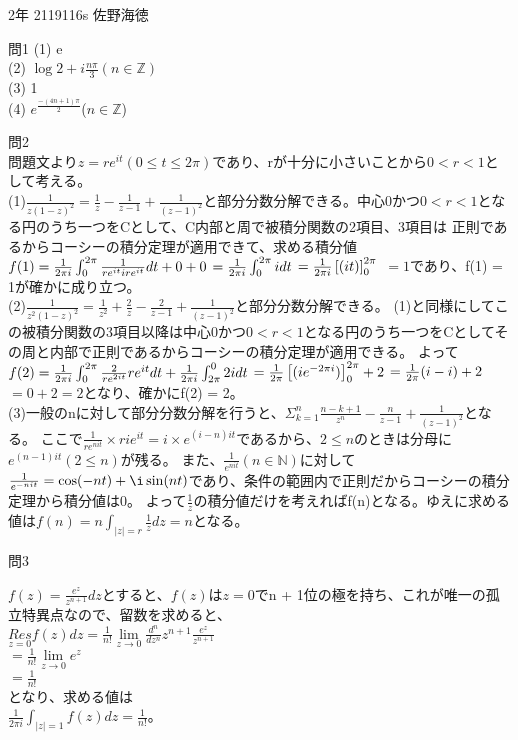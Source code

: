 \documentclass[11pt]{jsarticle}
\begin{document}
    2年 2119116s 佐野海徳\\
    \par 問1
    (1) e\\
    (2) $\log 2 + i \frac{n \pi}{3} (n \in \mathbb{Z})$\\
    (3) 1\\
    (4) $e^{\frac{- (4n + 1)\pi}{2}}$($n \in \mathbb{Z}$)
    \par 問2\\
    問題文より$z = re^{it}(0 \leq t \leq 2\pi)$であり、rが十分に小さいことから$0 < r < 1$として考える。\\
    (1)$\frac{1}{z(1 - z)^2} = \frac{1}{z} - \frac{1}{z - 1} + \frac{1}{(z - 1)^2}$と部分分数分解できる。中心0かつ$0 < r < 1$となる円のうち一つをCとして、C内部と周で被積分関数の2項目、3項目は
    正則であるからコーシーの積分定理が適用できて、求める積分値$f(1) = \frac{1}{2\pi i} \int_{0}^{2\pi} \frac{1}{re^{it} ire^{it}}dt + 0 + 0\\$
    $ = \frac{1}{2\pi i} \int_{0}^{2\pi} i dt \\$
    $ = \frac{1}{2\pi i}\left[ (it) \right]_{0}^{2\pi}\\$
    $ = 1$であり、f(1) = 1が確かに成り立つ。\\
    (2)$\frac{1}{z^2(1 - z)^2} = \frac{1}{z^2} + \frac{2}{z} - \frac{2}{z - 1} + \frac{1}{(z - 1)^2}$と部分分数分解できる。
    (1)と同様にしてこの被積分関数の3項目以降は中心0かつ$0 < r < 1$となる円のうち一つをCとしてその周と内部で正則であるからコーシーの積分定理が適用できる。
    よって$f(2) = \frac{1}{2\pi i} \int_{0}^{2\pi} \frac{2}{re^{2it}}re^{it}dt + \frac{1}{2\pi i} \int_{2\pi}^{0} 2i dt \\$
    $ = \frac{1}{2\pi}\left[ (ie^{-2\pi i}) \right]_{0}^{2\pi} + 2\\$
    $ = \frac{1}{2\pi}(i - i) + 2\\$
    $ = 0 + 2 = 2$となり、確かにf(2) = 2。\\
    (3)一般のnに対して部分分数分解を行うと、$\Sigma_{k = 1}^{n} \frac{n - k + 1}{z^n} - \frac{n}{z - 1} + \frac{1}{(z - 1)^2}$となる。
    ここで$\frac{1}{re^{nit}} \times rie^{it} = i\times e^{(i - n)it}$であるから、$2 \leq n$のときは分母に${e^{(n - 1)it}}(2 \leq n)$が残る。
    また、$\frac{1}{e^{nit}}(n \in \mathbb{N})$に対して$\frac{1}{e^{-nit}} = \cos(-nt) + \i\sin(nt)$であり、条件の範囲内で正則だからコーシーの積分定理から積分値は0。
    よって$\frac{1}{z}$の積分値だけを考えればf(n)となる。ゆえに求める値は$f(n) = n \int_{|z| = r} \frac{1}{z} dz = n$となる。
    \newpage
\par 問3
    \par $f(z) = \frac{e^z}{z^{n + 1}}dz$とすると、$f(z)$は$z = 0$でn + 1位の極を持ち、これが唯一の孤立特異点なので、留数を求めると、\\
    $\underset{z = 0}{Res}f(z) dz = \frac{1}{n!} \underset{z \rightarrow 0}{\lim}\frac{d^n}{dz^n}{z^{n + 1} \frac{e^z}{z^{n + 1}}}$\\
    $ = \frac{1}{n!}\underset{z \rightarrow 0}{\lim}e^z$\\
    $ = \frac{1}{n!}$\\
    となり、求める値は\\
    $\frac{1}{2\pi i}\int_{|z| = 1} f(z) dz = \frac{1}{n!}$。
\end{document}
